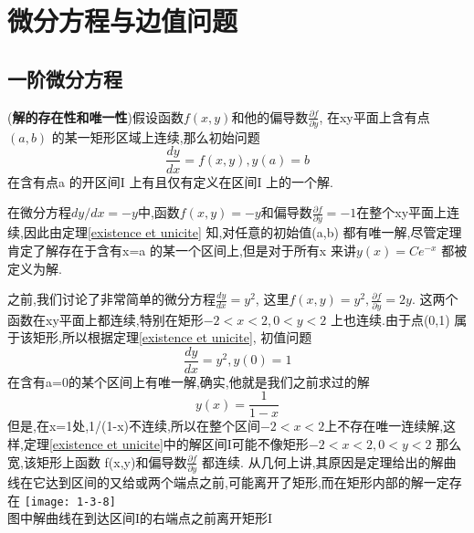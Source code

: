 \documentclass[openany]{book}
\begin{document}
\chapter{微分方程与边值问题}
\section{一阶微分方程}
\begin{theorem}
  ({\bf 解的存在性和唯一性})假设函数$f(x,y)$和他的偏导数$\frac{\partial f}{\partial y}$, 在xy平面上含有点$(a,b)$ 的某一矩形区域上连续,那么初始问题
  \begin{equation}
    \frac{dy}{dx}=f(x,y),y(a)=b
  \end{equation}
  在含有点a 的开区间I 上有且仅有定义在区间I 上的一个解.
  \label{existence et unicite}
\end{theorem}
\begin{example}
  在微分方程$dy/dx=-y$中,函数$f(x,y)=-y$和偏导数$\frac{\partial f}{\partial y}=-1$在整个xy平面上连续,因此由定理\ref{existence et unicite} 知,对任意的初始值(a,b) 都有唯一解,尽管定理肯定了解存在于含有x=a 的某一个区间上,但是对于所有x 来讲$y(x)=Ce^{-x}$ 都被定义为解.
\end{example}
\begin{note}
  之前,我们讨论了非常简单的微分方程$\frac{dy}{dx}=y^2$, 这里$f(x,y)=y^2,\frac{\partial f}{\partial y}=2y$. 这两个函数在xy平面上都连续,特别在矩形$-2<x<2,0<y<2 $ 上也连续.由于点(0,1) 属于该矩形,所以根据定理\ref{existence et unicite}, 初值问题
  \begin{equation}
    \frac{dy}{dx}=y^2,y(0)=1
  \end{equation}
  在含有a=0的某个区间上有唯一解,确实,他就是我们之前求过的解$$y(x)=\frac{1}{1-x}$$
  但是,在x=1处,1/(1-x)不连续,所以在整个区间$-2<x<2 $上不存在唯一连续解,这样,定理\ref{existence et unicite}中的解区间I可能不像矩形$-2<x<2,0<y<2$ 那么宽,该矩形上函数 f(x,y)和偏导数$\frac{\partial f}{\partial y}$ 都连续. 从几何上讲,其原因是定理给出的解曲线在它达到区间的又给或两个端点之前,可能离开了矩形,而在矩形内部的解一定存在 \newline
\texttt{[image: 1-3-8]}\\
图中解曲线在到达区间I的右端点之前离开矩形I
\end{note}
\end{document}
